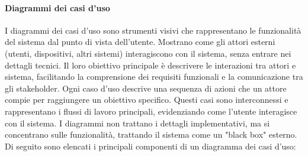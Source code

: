 \paragraph{Diagrammi dei casi d'uso} 
I diagrammi dei casi d'uso sono strumenti visivi che rappresentano le funzionalità del sistema dal punto di vista dell'utente. Mostrano come gli attori esterni (utenti, dispositivi, altri sistemi) interagiscono con il sistema, senza entrare nei dettagli tecnici. Il loro obiettivo principale è descrivere le interazioni tra attori e sistema, facilitando la comprensione dei requisiti funzionali e la comunicazione tra gli stakeholder. Ogni caso d'uso descrive una sequenza di azioni che un attore compie per raggiungere un obiettivo specifico. Questi casi sono interconnessi e rappresentano i flussi di lavoro principali, evidenziando come l'utente interagisce con il sistema. I diagrammi non trattano i dettagli implementativi, ma si concentrano sulle funzionalità, trattando il sistema come un "black box" esterno.\\
\medskip Di seguito sono elencati i principali componenti di un diagramma dei casi d’uso:

